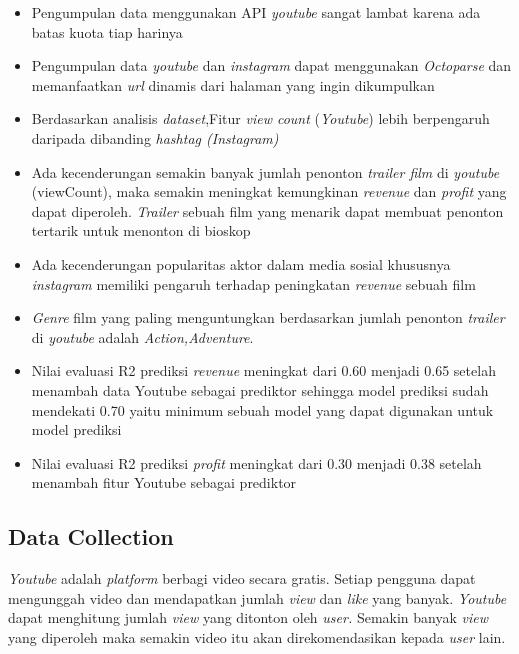 \begin{itemize}
\item Pengumpulan data menggunakan API \textit{youtube}  sangat lambat karena ada batas kuota tiap harinya 
\item Pengumpulan data \textit{youtube} dan \textit{instagram} dapat menggunakan \textit{Octoparse} dan memanfaatkan \textit{url} dinamis dari halaman yang ingin dikumpulkan

\item Berdasarkan analisis \textit{dataset},Fitur \textit{view count} (\textit{Youtube}) lebih berpengaruh daripada dibanding \textit{hashtag (Instagram)}

\item Ada kecenderungan semakin banyak jumlah penonton \textit{trailer film} di \textit{youtube} (viewCount), maka semakin meningkat kemungkinan \textit{revenue} dan \textit{profit} yang dapat diperoleh. \textit{Trailer} sebuah film yang menarik dapat membuat penonton tertarik untuk menonton di bioskop


\item Ada kecenderungan popularitas aktor dalam media sosial khususnya \textit{instagram} memiliki pengaruh terhadap peningkatan \textit{revenue} sebuah film


\item \textit{Genre} film yang paling menguntungkan berdasarkan jumlah penonton \textit{trailer} di \textit{youtube} adalah \textit{Action,Adventure}.

\item Nilai evaluasi R2 prediksi \textit{revenue} meningkat dari 0.60 menjadi 0.65 setelah menambah data Youtube sebagai prediktor sehingga model prediksi sudah mendekati 0.70 yaitu minimum sebuah model yang dapat digunakan untuk model prediksi 

\item Nilai evaluasi R2 prediksi \textit{profit} meningkat dari 0.30 menjadi 0.38 setelah menambah fitur Youtube sebagai prediktor

\end{itemize}




\subsection{Data Collection}
\textit{Youtube} adalah \textit{platform} berbagi video secara gratis. Setiap pengguna dapat mengunggah video dan mendapatkan jumlah \textit{view} dan \textit{like} yang banyak.  \textit{Youtube} dapat menghitung jumlah \textit{view} yang ditonton oleh \textit{user.} Semakin banyak \textit{view} yang diperoleh maka semakin video itu akan direkomendasikan kepada \textit{user} lain.

